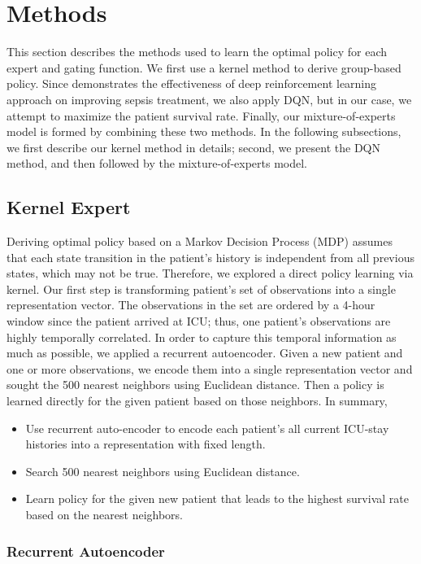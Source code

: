 \documentclass[letterpaper]{article}
\begin{document}
\section{Methods}
This section describes the methods used to learn the optimal policy for each expert and gating function. We first use a kernel method to derive group-based policy. 
Since \cite{DBLP:journals/corr/RaghuKCSG17} demonstrates the effectiveness of deep reinforcement learning approach on improving sepsis treatment, we also apply DQN, but in our case, we attempt to maximize the patient survival rate. Finally, our mixture-of-experts model is formed by combining these two methods. In the following subsections, we first describe our kernel method in details; second, we present the DQN method, and then followed by the mixture-of-experts model. 

\subsection{Kernel Expert}

Deriving optimal policy based on a Markov Decision Process (MDP) assumes that each state transition in the patient’s history is independent from all previous states, which may not be true. Therefore, we explored a direct policy learning via kernel. Our first step is transforming patient's set of observations into a single representation vector. The observations in the set are ordered by a 4-hour window since the patient arrived at ICU; thus, one patient's observations are highly temporally correlated. In order to capture this temporal information as much as possible, we applied a recurrent autoencoder. Given a new patient and one or more observations, we encode them into a single representation vector and sought the 500 nearest neighbors using Euclidean distance. Then a policy is learned directly for the given patient based on those neighbors. In summary,

\begin{itemize}
\item Use recurrent auto-encoder to encode each patient’s all current ICU-stay histories into a representation with fixed length.
\item Search 500 nearest neighbors using Euclidean distance.
\item Learn policy for the given new patient that leads to the highest survival rate based on the nearest neighbors.
\end{itemize}

\subsubsection{Recurrent Autoencoder}
\end{document}
